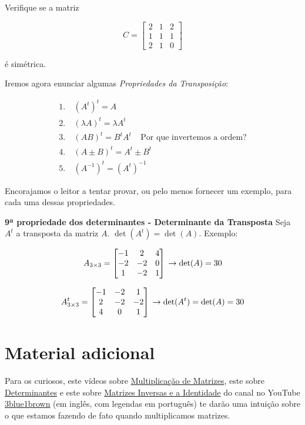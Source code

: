 \documentclass[
  letterpaper,
  DIV=11,
  numbers=noendperiod]{scrreprt}
\begin{document}
Verifique se a matriz

\[
C = \begin{bmatrix}
    2 & 1 & 2\\
    1 & 1 & 1\\
    2 & 1 & 0 
\end{bmatrix}
\]

é simétrica.

Iremos agora enunciar algumas \emph{Propriedades da Transposição}:

\[
\begin{aligned}
1.&~ (A^{t})^{t} = A \\
2.&~ (\lambda A)^{t} = \lambda A^{t} \\
3.&~ (AB)^{t} = B^t A^t ~~~~~ \text{Por que invertemos a ordem?} \\
4.&~ (A \pm B)^{t} = A^t \pm B^t \\
5.&~ (A^{-1})^{t} = (A^{t})^{-1}
\end{aligned}
\]

Encorajamos o leitor a tentar provar, ou pelo menos fornecer um exemplo,
para cada uma dessas propriedades.

\textbf{9ª propriedade dos determinantes - Determinante da Transposta}
Seja \(A^t\) a transposta da matriz \(A\). \(\det(A^t) = \det(A)\).
Exemplo:

\[
A_{3\times3} =
\begin{bmatrix}
    -1 & 2 & 4  \\
    -2 & -2 & 0 \\
    1 & -2 & 1 \\
\end{bmatrix}  \\
\rightarrow \det(A) = 30
\]

\[
A^t_{3\times3} =
\begin{bmatrix}
    -1 & -2 & 1 \\
    2 & -2 & -2 \\
    4 & 0 & 1 \\
\end{bmatrix}  \\
\rightarrow \det(A^t) = \det(A) = 30
\]

\section{Material adicional}\label{sec-material-matrizes}

Para os curiosos, este vídeos sobre
\href{https://youtu.be/XkY2DOUCWMU}{Multiplicação de Matrizes}, este
sobre \href{https://www.youtube.com/watch?v=Ip3X9LOh2dk}{Determinantes}
e este sobre \href{https://youtu.be/uQhTuRlWMxw}{Matrizes Inversas e a
Identidade} do canal no YouTube
\href{https://www.youtube.com/@3blue1brown}{3blue1brown} (em inglês, com
legendas em português) te darão uma intuição sobre o que estamos fazendo
de fato quando multiplicamos matrizes.
\end{document}
